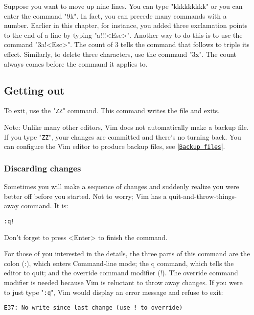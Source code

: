 Suppose you want to move up nine lines.
You can type "kkkkkkkkk" or you can enter the command "9k".
In fact, you can precede many commands with a number.
Earlier in this chapter, for instance, you added three exclamation points to the end of a line by typing "a!!!<Esc>".
Another way to do this is to use the command "3a!<Esc>".
The count of 3 tells the command that follows to triple its effect.
Similarly, to delete three characters, use the command "3x".
The count always comes before the command it applies to.

\subsection{Getting out}

To exit, use the "\texttt{ZZ}" command.  This command writes the file and exits.

Note:\newline
Unlike many other editors, Vim does not automatically make a backup file.
If you type "\texttt{ZZ}", your changes are committed and there's no turning back.
You can configure the Vim editor to produce backup files, see |\hyperref[Backup files]{\texttt{Backup files}}|.

\subsubsection{Discarding changes}

Sometimes you will make a sequence of changes and suddenly realize you were better off before you started.
Not to worry; Vim has a quit-and-throw-things-away command.
It is: 

	\begin{Verbatim}[samepage=true]
	:q!
	\end{Verbatim}

Don't forget to press <Enter> to finish the command.

For those of you interested in the details, the three parts of this command are the colon (:), which enters Command-line mode; the q command, which tells the editor to quit; and the override command modifier (!).
The override command modifier is needed because Vim is reluctant to throw away changes.
If you were to just type "\texttt{:q}", Vim would display an error message and refuse to exit: 

		\begin{Verbatim}[samepage=true]
    E37: No write since last change (use ! to override) 
		\end{Verbatim}

